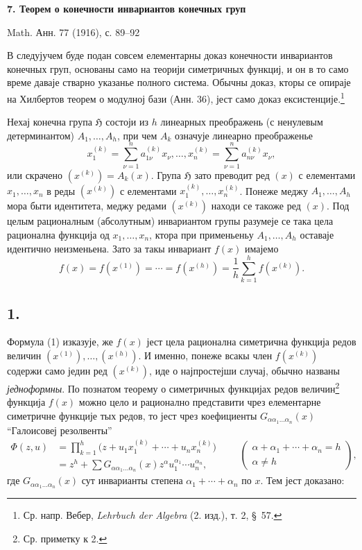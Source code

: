 ﻿\documentclass[11pt]{article}
\providecommand{\Hgrp}{\mathfrak{H}}
\begin{document}
\begin{center}
{\Large\bfseries 7. Теорем о конечности инвариантов конечных груп}\par
\vspace{1.2em}
Math. Анн. 77 (1916), с. 89--92
\end{center}

\vspace{1em}

В следујучем буде подан совсем елементарны доказ конечности инвариантов конечных груп, основаны само на теорији симетричных функциј, и он в то само време даваје стварно указанье полного система. Обычны доказ, кторы се опираје на Хилбертов теорем о модулној бази (Анн. 36), јест само доказ ексистенције.\footnote{Ср. напр. Вебер, \emph{Lehrbuch der Algebra} (2. изд.), т. 2, \S\ 57.}

Нехај конечна група $\Hgrp$ состоји из $h$ линеарных преображень (с ненулевым детерминантом) $A_1,\ldots,A_h$, при чем $A_k$ означује линеарно преображенье
\[
  x_1^{(k)}=\sum_{\nu=1}^{n}a_{1\nu}^{(k)}x_\nu,\ldots,
  x_n^{(k)}=\sum_{\nu=1}^{n}a_{n\nu}^{(k)}x_\nu,
\]
или скрачено $(x^{(k)})=A_k(x)$. Група $\Hgrp$ зато преводит ред $(x)$ с елементами $x_1,\ldots,x_n$ в реды $(x^{(k)})$ с елементами $x_1^{(k)},\ldots,x_n^{(k)}$. Понеже меджу $A_1,\ldots,A_h$ мора быти идентитета, меджу редами $(x^{(k)})$ находи се такоже ред $(x)$. Под целым рационалным (абсолутным) инвариантом групы разумеје се така цела рационална функција од $x_1,\ldots,x_n$, ктора при применьеньу $A_1,\ldots,A_h$ оставаје идентично неизменьена. Зато за такы инвариант $f(x)$ имајемо
\begin{equation}
  f(x)=f(x^{(1)})=\cdots=f(x^{(h)})=
  \frac1h\sum_{k=1}^{h}f(x^{(k)}).
\tag{1}
\end{equation}

\subsection*{1.}
Формула (1) изказује, же $f(x)$ јест цела рационална симетрична функција редов величин $(x^{(1)}),\ldots,(x^{(h)})$. И именно, понеже всакы член $f(x^{(k)})$ содержи само једин ред $(x^{(k)})$, иде о најпростејши случај, обычно названы {\itshape једноформны}. По познатом теорему о симетричных функцијах редов величин\footnote{Ср. приметку к 2.} функција $f(x)$ можно цело и рационално представити чрез елементарне симетричне функције тых редов, то јест чрез коефициенты $G_{\alpha\alpha_1\ldots\alpha_n}(x)$ ``Галоисовеј резолвенты''
\[
\begin{aligned}
  \Phi(z,u)
  &=\prod_{k=1}^{h}\bigl(z+u_1x_1^{(k)}+\cdots+u_nx_n^{(k)}\bigr) \\
  &=z^h+
    \sum G_{\alpha\alpha_1\ldots\alpha_n}(x)
    z^{\alpha}u_1^{\alpha_1}\cdots u_n^{\alpha_n},
\end{aligned}
\qquad
\left(\begin{array}{c}
\alpha+\alpha_1+\cdots+\alpha_n=h\\
\alpha\ne h
\end{array}\right),
\]
где $G_{\alpha\alpha_1\ldots\alpha_n}(x)$ сут инварианты степена $\alpha_1+\cdots+\alpha_n$ по $x$. Тем јест доказано:
\end{document}
